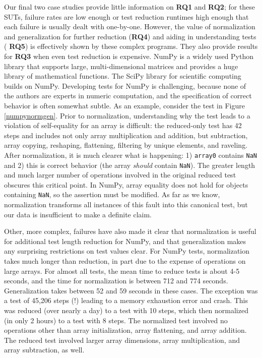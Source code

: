 Our final two case studies provide little information on {\bf RQ1} and
{\bf RQ2}; for these SUTs, failure rates are low enough or test
reduction runtimes high enough that each failure is usually dealt with
one-by-one.  However, the value of normalization and generalization
for further reduction ({\bf RQ4}) and aiding in understanding tests ({\bf
  RQ5}) is effectively shown by these complex programs.  They also provide
results for {\bf RQ3} when even test reduction is expensive.
NumPy \cite{NumPy} is a widely used Python library that
supports large, multi-dimensional matrices and provides a huge library
of mathematical functions.  The SciPy library for scientific
computing builds on NumPy.  Developing tests for NumPy is challenging,
because none of the authors are experts in numeric computation, and
the specification of correct behavior is often somewhat subtle.  As an
example, consider the test in Figure \ref{numpynormgen}.  Prior to
normalization, understanding why the test leads to a violation of
self-equality for an array is difficult: the reduced-only test has 42
steps and includes not only array multiplication and addition, but
subtraction, array copying, reshaping, flattening,  filtering by
unique elements, and raveling.  After
normalization, it is much clearer what is happening: 1) {\tt array0}
contains {\tt NaN} and 2) this is correct behavior (the array
\emph{should} contain {\tt NaN}).  The greater length and much larger
number of operations involved in the original reduced test
obscures this critical point.  In NumPy, array equality does not hold
for objects containing {\tt NaN}, so the assertion must be modified.
As far as we know, normalization transforms all instances of this
fault into this canonical test, but our data is insufficient to make a definite claim.

Other, more complex, failures have also made it clear that
normalization is useful for additional test length reduction for
NumPy, and that generalization makes any surprising restrictions on
test values clear.  For NumPy tests, normalization takes much longer
than reduction, in part due to the expense of operations on large
arrays.  For almost all tests, the mean time to reduce tests
is about 4-5 seconds, and the time for normalization is between 712
and 774 seconds.   Generalization takes
between 52 and 59 seconds in these cases.  The exception was a test of 45,206 steps (!)  leading to a memory exhaustion error and
crash.  This was reduced (over nearly a day) to a test
with 10 steps, which then normalized (in only 2 hours) to a test
with 8 steps.  The normalized test involved no operations other than array
initialization, array flattening, and array
addition.  The reduced test involved larger array dimensions, array
multiplication, and array subtraction, as well.  




